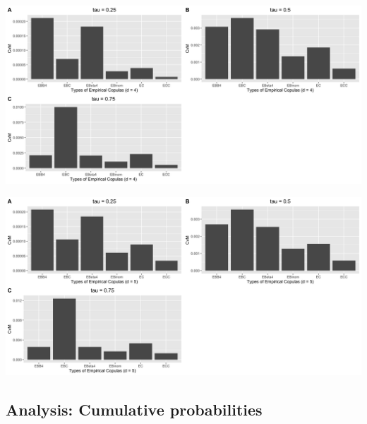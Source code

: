 \documentclass[12pt]{report}
\newcommand{\1}{\mathbf{1}}
\begin{document}
\begin{flushleft}
\begin{center}
\label{C_4d_c_CvM}
\includegraphics[width=17cm]{CumulativeCvM/C_4d_c_CvM.png}
\end{center}%

\begin{center}
\label{C_5d_c_CvM}
\includegraphics[width=17cm]{CumulativeCvM/C_5d_c_CvM.png}
\end{center}%

\newpage
\subsection{Analysis: Cumulative probabilities}


\end{flushleft}
 
\medskip

\printbibliography
\end{document}
